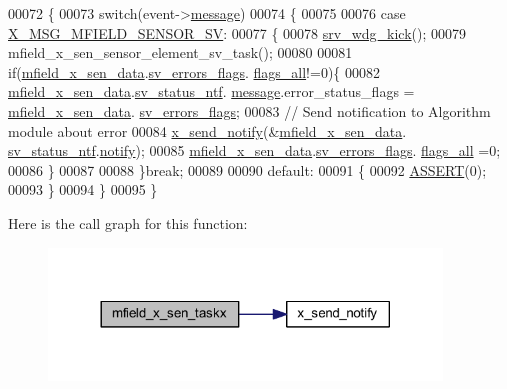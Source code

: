 \begin{DoxyCode}
00072 \{
00073     \textcolor{keywordflow}{switch}(event->\hyperlink{a00036_adf9665938515a20c283eea2c978cf80d}{message})
00074     \{
00075 
00076         \textcolor{keywordflow}{case} \hyperlink{a00025_a510020575747f82c587c5485b8619f78}{X\_MSG\_MFIELD\_SENSOR\_SV}:
00077         \{
00078             \hyperlink{a00067_a710d148845397582739d170341f3d3d9}{srv\_wdg\_kick}();
00079             mfield\_x\_sen\_sensor\_element\_sv\_task();
00080 
00081             \textcolor{keywordflow}{if}(\hyperlink{a00050_af8c531b1ba5fea148fb9111e06058f92}{mfield\_x\_sen\_data}.\hyperlink{a00025_aaeec6b0609dba31393f337abf1cce3d3}{sv\_errors\_flags}.
      \hyperlink{a00022_a1caa87b00c878186140c3bac9c8acf3b}{flags\_all}!=0)\{
00082              \hyperlink{a00050_af8c531b1ba5fea148fb9111e06058f92}{mfield\_x\_sen\_data}.\hyperlink{a00025_a752b00333ec308e07c6bd41aa9a01e73}{sv\_status\_ntf}.
      \hyperlink{a00019_a946af134546e64739ccfd37633480dc2}{message}.error\_status\_flags = \hyperlink{a00050_af8c531b1ba5fea148fb9111e06058f92}{mfield\_x\_sen\_data}.
      \hyperlink{a00025_aaeec6b0609dba31393f337abf1cce3d3}{sv\_errors\_flags};
00083              \textcolor{comment}{// Send notification to Algorithm module about error}
00084              \hyperlink{a00036_ae17b0bb16da3c471bb6074bb4c4d0fee}{x\_send\_notify}(&\hyperlink{a00050_af8c531b1ba5fea148fb9111e06058f92}{mfield\_x\_sen\_data}.
      \hyperlink{a00025_a752b00333ec308e07c6bd41aa9a01e73}{sv\_status\_ntf}.\hyperlink{a00019_a8e6a04c2283f9fd7b8dcbc62faba5847}{notify});
00085              \hyperlink{a00050_af8c531b1ba5fea148fb9111e06058f92}{mfield\_x\_sen\_data}.\hyperlink{a00025_aaeec6b0609dba31393f337abf1cce3d3}{sv\_errors\_flags}.
      \hyperlink{a00022_a1caa87b00c878186140c3bac9c8acf3b}{flags\_all} =0;
00086             \}
00087 
00088         \}\textcolor{keywordflow}{break};
00089 
00090         \textcolor{keywordflow}{default}:
00091         \{
00092             \hyperlink{a00072_abb8ff8e213ac9f6fb21d2b968583b936}{ASSERT}(0);
00093         \}
00094     \}
00095 \}
\end{DoxyCode}


Here is the call graph for this function\+:\nopagebreak
\begin{figure}[H]
\begin{center}
\leavevmode
\includegraphics[width=296pt]{d5/de0/a00050_a72e9235043dc4a8469143a6eb48bf117_cgraph}
\end{center}
\end{figure}





